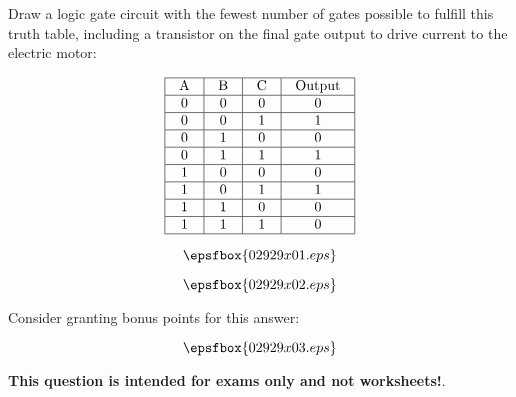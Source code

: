 

Draw a logic gate circuit with the fewest number of gates possible to fulfill this truth table, including a transistor on the final gate output to drive current to the electric motor:


$$\vbox{\offinterlineskip
\halign{\strut
\vrule \quad\hfil # \ \hfil & 
\vrule \quad\hfil # \ \hfil & 
\vrule \quad\hfil # \ \hfil & 
\vrule \quad\hfil # \ \hfil \vrule \cr
\noalign{\hrule}
%
A & B & C & Output \cr
%
\noalign{\hrule}
%
0 & 0 & 0 & 0 \cr
%
\noalign{\hrule}
%
0 & 0 & 1 & 1 \cr
%
\noalign{\hrule}
%
0 & 1 & 0 & 0 \cr
%
\noalign{\hrule}
%
0 & 1 & 1 & 1 \cr
%
\noalign{\hrule}
%
1 & 0 & 0 & 0 \cr
%
\noalign{\hrule}
%
1 & 0 & 1 & 1 \cr
%
\noalign{\hrule}
%
1 & 1 & 0 & 0 \cr
%
\noalign{\hrule}
%
1 & 1 & 1 & 0 \cr
%
\noalign{\hrule}
} %
}$$ %

$$\epsfbox{02929x01.eps}$$







$$\epsfbox{02929x02.eps}$$

Consider granting bonus points for this answer:

$$\epsfbox{02929x03.eps}$$







{\bf This question is intended for exams only and not worksheets!}.




